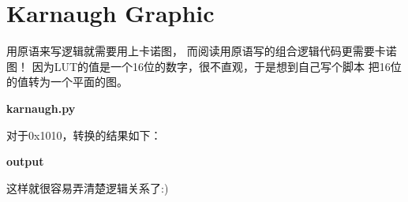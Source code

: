 \section{Karnaugh Graphic}
用原语来写逻辑就需要用上卡诺图，
而阅读用原语写的组合逻辑代码更需要卡诺图！
因为LUT的值是一个16位的数字，很不直观，于是想到自己写个脚本
把16位的值转为一个平面的图。

\textbf{karnaugh.py}


对于0x1010，转换的结果如下：

\textbf{output}


这样就很容易弄清楚逻辑关系了:) 

